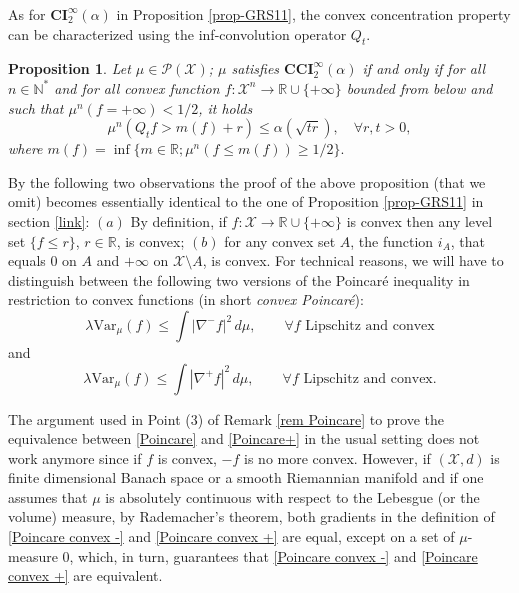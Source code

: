 \documentclass[11pt]{amsart}
\newtheorem{prop}[equation]{Proposition}
\numberwithin{equation}{section}
\begin{document}
As for $\mathbf{CI}_2^\infty(\alpha)$  in Proposition \ref{prop-GRS11}, the convex concentration property can be characterized using the inf-convolution operator $Q_t$.
\begin{prop}\label{concconvfunc}
Let $\mu \in \mathcal{P}({\mathcal{X}})$; $\mu$ satisfies $\mathbf{CCI}_2^\infty(\alpha)$ if and only if for all $n\in {\mathbb{N}}^*$ and for all convex  function $f:{\mathcal{X}}^n \to {\mathbb{R}}\cup\{+\infty\}$ bounded from below and such that $\mu^n(f=+\infty)<1/2$, it holds
\begin{equation}\label{eq-GRS11convex}
 \mu^n(Q_t f > m(f) +r)\leq \alpha(\sqrt{tr}),\quad \forall r,t>0,
 \end{equation}
where $m(f)=\inf\{m\in{\mathbb{R}};\mu^n(f\leq m(f)) \geq 1/2\}.$
\end{prop}
\proof 
By the following two observations the proof of the above proposition (that we omit) becomes essentially identical to the one of  Proposition \ref{prop-GRS11} in section \ref{link}:
$(a)$ By definition, if $f:{\mathcal{X}}\to {\mathbb{R}}\cup\{+\infty\}$ is convex then any level set $\{f\leq r\}$, $r\in{\mathbb{R}}$, is convex; $(b)$ for any convex set $A$, the function $i_A$, that equals 0 on $A$ and $+\infty$ on ${\mathcal{X}}\setminus A$, is convex.
\endproof
For technical reasons, we will have to distinguish between the following two versions of the Poincar\'e inequality in restriction to convex functions (in short \emph{convex Poincar\'e}):
\begin{equation}\label{Poincare convex -}
\lambda\mathrm{Var}_\mu(f)\leq \int |\nabla^-f|^2\,d\mu,\qquad \forall f \text{ Lipschitz and convex}
\end{equation}
and
\begin{equation}\label{Poincare convex +}
\lambda\mathrm{Var}_\mu(f)\leq \int |\nabla^+f|^2\,d\mu,\qquad \forall f \text{ Lipschitz and convex}.
\end{equation}

The argument used in Point (3) of Remark \ref{rem Poincare} to prove the equivalence between \eqref{Poincare} and \eqref{Poincare+} in the usual setting does not work anymore since if $f$ is convex, $-f$ is no more convex. 
However, if $({\mathcal{X}},d)$ is finite dimensional Banach space or a smooth Riemannian manifold and if one assumes that $\mu$ is absolutely continuous with respect to the Lebesgue (or the volume) measure, by Rademacher's theorem, both gradients in the definition of \eqref{Poincare convex -} and \eqref{Poincare convex +} are equal, except on a set of $\mu$-measure 0, which, in turn, guarantees that  
\eqref{Poincare convex -} and \eqref{Poincare convex +} are equivalent. 
\end{document}
